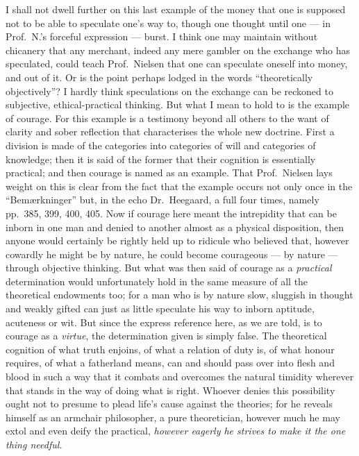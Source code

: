 \documentclass[12pt,a4paper]{book}
\newcommand{\opage}[1]{\marginnote{\footnotesize\textit{[#1]}}}
\begin{document}
I shall not dwell further on this last example of the money that one is
supposed not to be able to speculate one's way to, though one thought until one
--- in Prof.\ N.'s forceful expression --- burst. I think one may maintain
without chicanery that any merchant, indeed any mere gambler on the exchange
who has speculated, could teach Prof.\ Nielsen that one can speculate oneself
into money, and out of it. Or is the point perhaps lodged in the words
``theoretically objectively''? I hardly think speculations on the exchange can
be reckoned to subjective, ethical-practical thinking. But what I mean to hold
to is the example of courage. For this example is a testimony beyond all others
to the want of clarity and sober reflection that characterises the whole new
doctrine. First a division is made of the categories into categories of will
and categories of knowledge; then it is said of the former that their cognition
is essentially practical; and then courage is named as an example. That Prof.\
Nielsen lays weight on this is clear from the fact that the example occurs not
only once in the ``Bemærkninger'' but, in the echo Dr.\ Heegaard, a full four
times, namely pp.\ 385, 399, 400, 405. Now if courage here meant the
intrepidity that can be inborn in one man and denied to another almost as a
physical disposition, then anyone would certainly be rightly
\opage{64}held up to ridicule who believed that, however cowardly he might be
by nature, he could become courageous --- by nature --- through objective
thinking. But what was then said of courage as a \emph{practical} determination
would unfortunately hold in the same measure of all the theoretical endowments
too; for a man who is by nature slow, sluggish in thought and weakly gifted can
just as little speculate his way to inborn aptitude, acuteness or wit. But
since the express reference here, as we are told, is to courage as a
\emph{virtue}, the determination given is simply false. The theoretical
cognition of what truth enjoins, of what a relation of duty is, of what honour
requires, of what a fatherland means, can and should pass over into flesh and
blood in such a way that it combats and overcomes the natural timidity wherever
that stands in the way of doing what is right. Whoever denies this possibility
ought not to presume to plead life's cause against the theories; for he reveals
himself as an armchair philosopher, a pure theoretician, however much he may
extol and even deify the practical, \emph{however eagerly he strives to make it
the one thing needful.}
\end{document}
